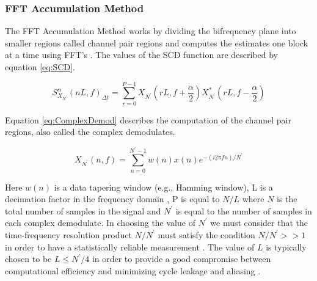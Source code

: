 \subsubsection{FFT Accumulation Method}
\label{sect:FAM}
The FFT Accumulation Method works by dividing the bifrequency plane into smaller regions called channel pair regions and computes the estimates one block at a time using FFT's \cite{Pace03}.  The values of the SCD function are described by equation \ref{eq:SCD}.

\begin{equation}
S^{\alpha}_{X_{N^\prime}} {(n L, f)}_{\Delta t} = \sum_{r=0}^{P-1} X_{N^\prime}(r L,f + \frac{\alpha}{2}) X_{N^\prime}^*(r L, f - \frac{\alpha}{2})
\label{eq:SCD}
\end{equation}

Equation \ref{eq:ComplexDemod} describes the computation of the channel pair regions, also called the complex demodulates.

\begin{equation}
X_{N^\prime}(n,f) = \sum_{n=0}^{N^\prime - 1} w(n) x(n) e^{-(i 2 \pi f n)/N^\prime}
\label{eq:ComplexDemod}
\end{equation}

Here \begin{math}w(n)\end{math} is a data tapering window (e.g., Hamming window), L is a decimation factor in the frequency domain \cite{FenChenWan08}, P is equal to \begin{math}N / L \end{math} where $N$ is the total number of samples in the signal and $N^\prime$ is equal to the number of samples in each complex demodulate.  In choosing the value of \begin{math}N^\prime \end{math} we must consider that the time-frequency resolution product \begin{math}N/N^\prime\end{math} must satisfy the condition \begin{math}N/N^\prime >> 1\end{math} in order to have a statistically reliable measurement \cite{RobBroLoo91}.  The value of $L$ is typically chosen to be \begin{math}L \le N^\prime / 4\end{math} in order to provide a good compromise between computational efficiency and minimizing cycle leakage and aliasing \cite{RobBroLoo91}.

